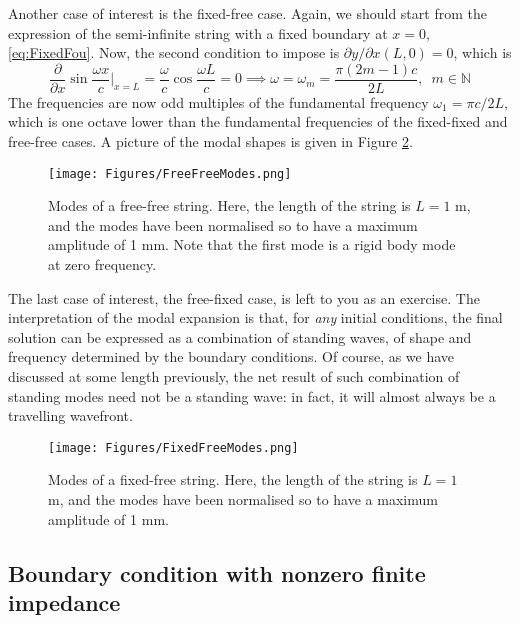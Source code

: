 \documentclass[11pt,twoside,a4paper,english]{book}
\begin{document}
\medskip \medskip 

\noindent
Another case of interest is the fixed-free case. Again, we should start from the expression of the semi-infinite string with a fixed boundary at $x=0$, \eqref{eq:FixedFou}. Now, the second condition to impose is $\partial y / \partial x (L,0) = 0$, which is
\begin{equation}
\frac{\partial}{\partial x}\sin\frac{\omega x}{c}\Bigg|_{x=L} =  \frac{\omega}{c} \cos \frac{\omega L}{c} = 0 \implies \omega = \omega_m = \frac{\pi (2m-1) c}{2L}, \,\,\, m \in \mathbb{N}
\end{equation}
The frequencies are now odd multiples of the fundamental frequency $\omega_1 = \pi c / 2 L$, which is one octave lower than the fundamental frequencies of the fixed-fixed and free-free cases. A picture of the modal shapes is given in Figure \ref{fig:fixfree}.


\begin{figure}[hbt]
\texttt{[image: Figures/FreeFreeModes.png]}
\caption{Modes of a free-free string. Here, the length of the string is $L =1$ m, and the modes have been normalised so to have a maximum amplitude of 1 mm. Note that the first mode is a rigid body mode at zero frequency.}\label{fig:freefree}
\end{figure}

\medskip \medskip 

\noindent
The last case of interest, the free-fixed case, is left to you as an exercise. The interpretation of the modal expansion is that, for \emph{any} initial conditions, the final solution can be expressed as a combination of standing waves, of shape and frequency determined by the boundary conditions. Of course, as we have discussed at some length previously, the net result of such combination of standing modes need not be a standing wave: in fact, it will almost always be a travelling wavefront. 


\begin{figure}[hbt]
\texttt{[image: Figures/FixedFreeModes.png]}
\caption{Modes of a fixed-free string. Here, the length of the string is $L =1$ m, and the modes have been normalised so to have a maximum amplitude of 1 mm.}\label{fig:fixfree}
\end{figure}



\subsection{Boundary condition with nonzero finite impedance}
\end{document}
